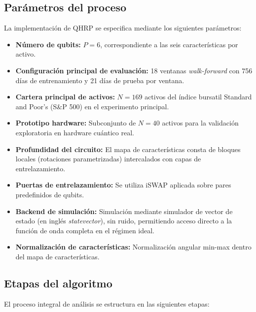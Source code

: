 \subsection{Parámetros del proceso}
\label{subsec:parametros_proceso}

La implementación de \gls{QHRP} se especifica mediante los siguientes parámetros:

\begin{itemize}
    \item \textbf{Número de qubits:} $P = 6$, correspondiente a las seis características por activo.
    \item \textbf{Configuración principal de evaluación:} 18 ventanas \textit{walk-forward} con 756 días de entrenamiento y 21 días de prueba por ventana.
    \item \textbf{Cartera principal de activos:} $N = 169$ activos del índice bursatil Standard and Poor's (S\&P 500) en el experimento principal.
    \item \textbf{Prototipo hardware:} Subconjunto de $N = 40$ activos para la validación exploratoria en hardware cuántico real.
    \item \textbf{Profundidad del circuito:} El mapa de características consta de bloques locales (rotaciones parametrizadas) intercalados con capas de entrelazamiento.
    \item \textbf{Puertas de entrelazamiento:} Se utiliza iSWAP aplicada sobre pares predefinidos de qubits.
    \item \textbf{Backend de simulación:} Simulación mediante simulador de vector de estado (en inglés \textit{statevector}), sin ruido, permitiendo acceso directo a la función de onda completa en el régimen ideal.
    \item \textbf{Normalización de características:} Normalización angular min-max dentro del mapa de características.
\end{itemize}

\subsection{Etapas del algoritmo}
\label{subsec:etapas_algoritmo}

El proceso integral de análisis se estructura en las siguientes etapas:

